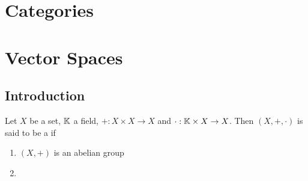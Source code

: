 \documentclass{book}
\begin{document}
 
 
 
 
 
 
 
 
 
 
 
 
 
 
 
 
 
 
 
 
 
 
 
 
 
 
 \newpage
 \chapter{Categories}
 
 

 
 
 
 
 
 
 
 
 
 
 
 
 
 
 
 
 
 
 
 
 
 
 
 
 
 
 
 
 
 
 
 
 \newpage
 \chapter{Vector Spaces}
 
 \section{Introduction}
 
 \begin{defn}
 	Let $X$ be a set, $\mathbb{K}$ a field, $+:X \times X \rightarrow X$ and $\cdot:\mathbb{K} \times X \rightarrow X$. Then $(X, +, \cdot)$ is said to be a  if 
 	\begin{enumerate}
 		\item $(X, +)$ is an abelian group
 		\item 
 	\end{enumerate} 
 \end{defn}
 
\end{document}
